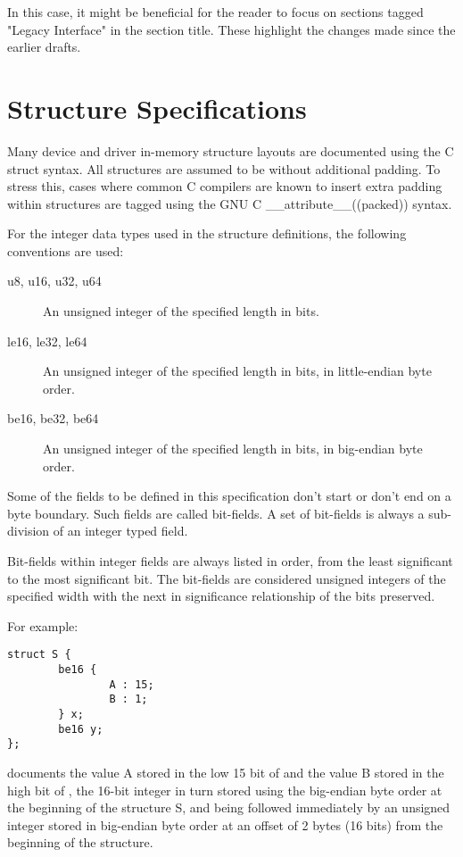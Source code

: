 In this case, it might be beneficial for the reader to focus on
sections tagged "Legacy Interface" in the section title.
These highlight the changes made since the earlier drafts.

\section{Structure Specifications}

Many device and driver in-memory structure layouts are documented using
the C struct syntax. All structures are assumed to be without additional
padding. To stress this, cases where common C compilers are known to insert
extra padding within structures are tagged using the GNU C
__attribute__((packed))  syntax.

For the integer data types used in the structure definitions, the following
conventions are used:

\begin{description}
\item[u8, u16, u32, u64] An unsigned integer of the specified length in bits.

\item[le16, le32, le64] An unsigned integer of the specified length in bits,
in little-endian byte order.

\item[be16, be32, be64] An unsigned integer of the specified length in bits,
in big-endian byte order.
\end{description}

Some of the fields to be defined in this specification don't
start or don't end on a byte boundary. Such fields are called bit-fields.
A set of bit-fields is always a sub-division of an integer typed field.

Bit-fields within integer fields are always listed in order,
from the least significant to the most significant bit.  The
bit-fields are considered unsigned integers of the specified
width with the next in significance relationship of the bits
preserved.

For example:
\begin{lstlisting}
struct S {
        be16 {
                A : 15;
                B : 1;
        } x;
        be16 y;
};
\end{lstlisting}
documents the value A stored in the low 15 bit of  and
the value B stored in the high bit of , the 16-bit
integer  in turn stored using the big-endian byte order
at the beginning of the structure S,
and being followed immediately by an unsigned integer 
stored in big-endian byte order at an offset of 2 bytes (16 bits)
from the beginning of the structure.

